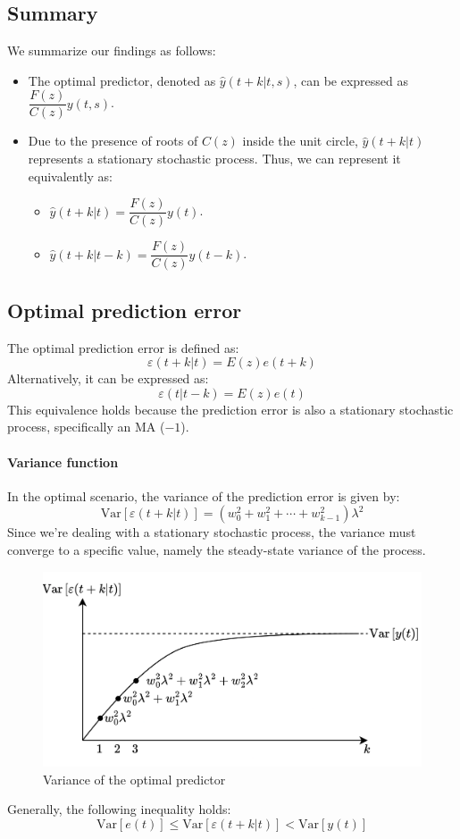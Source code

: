 \subsection{Summary}
We summarize our findings as follows:
\begin{itemize}
    \item The optimal predictor, denoted as $\hat{y}(t+k|t,s)$, can be expressed as $\dfrac{F(z)}{C(z)}y(t,s)$. 
    \item Due to the presence of roots of $C(z)$ inside the unit circle, $\hat{y}(t+k|t)$ represents a stationary stochastic process.
        Thus, we can represent it equivalently as:
        \begin{itemize}
            \item $\hat{y}(t+k|t)=\dfrac{F(z)}{C(z)}y(t)$. 
            \item $\hat{y}(t+k|t-k)=\dfrac{F(z)}{C(z)}y(t-k)$. 
        \end{itemize}
\end{itemize}

\subsection{Optimal prediction error}
The optimal prediction error is defined as:
\[\varepsilon(t+k|t)=E(z)e(t+k)\]
Alternatively, it can be expressed as:
\[\varepsilon(t|t-k)=E(z)e(t)\]
This equivalence holds because the prediction error is also a stationary stochastic process, specifically an MA ($-1$).

\paragraph*{Variance function}
In the optimal scenario, the variance of the prediction error is given by:
\[\text{Var}\left[\varepsilon(t+k|t)\right]=\left(w_0^2+w_1^2+\cdots+w_{k-1}^2\right)\lambda^2\]
Since we're dealing with a stationary stochastic process, the variance must converge to a specific value, namely the steady-state variance of the process.
\begin{figure}[H]
    \centering
    \includegraphics[width=0.75\linewidth]{images/var.png}
    \caption{Variance of the optimal predictor}
\end{figure}
Generally, the following inequality holds:
\[\text{Var}\left[e(t)\right] \leq \text{Var}\left[\varepsilon(t+k|t)\right] < \text{Var}\left[y(t)\right]\]